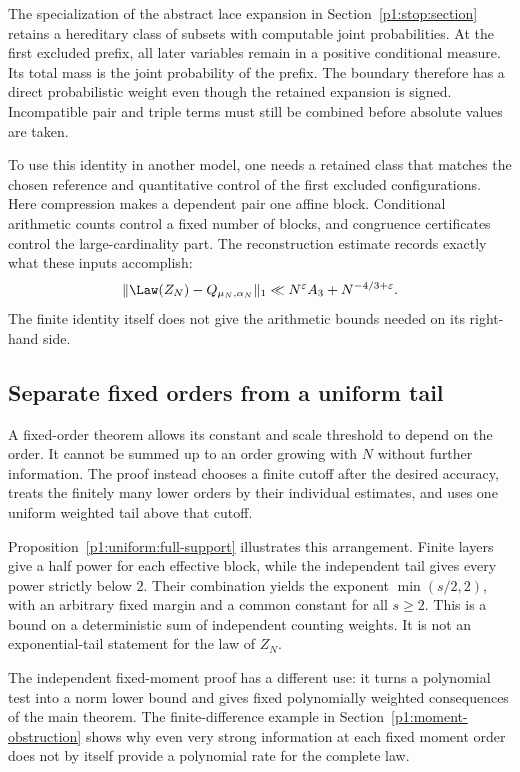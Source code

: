The specialization of the abstract lace expansion
\cite{zeilberger1997} in Section~\ref{p1:stop:section} retains a
hereditary class of subsets with computable joint probabilities.
At the first excluded prefix, all later variables remain in a
positive conditional measure. Its total mass is the joint
probability of the prefix. The boundary therefore has a direct
probabilistic weight even though the retained expansion is signed.
Incompatible pair and triple terms must still be combined before
absolute values are taken.

To use this identity in another model, one needs a retained class
that matches the chosen reference and quantitative control of the
first excluded configurations. Here compression makes a dependent
pair one affine block. Conditional arithmetic counts control a
fixed number of blocks, and congruence certificates control the
large-cardinality part. The reconstruction estimate records exactly
what these inputs accomplish:
\[
 \|\Law(Z_N)-Q_{\mu_N,\alpha_N}\|_1
       \ll N^\varepsilon A_3+N^{-4/3+\varepsilon}.
\]
The finite identity itself does not give the arithmetic bounds
needed on its right-hand side.

\subsection{Separate fixed orders from a uniform tail}

A fixed-order theorem allows its constant and scale threshold to
depend on the order. It cannot be summed up to an order growing
with \(N\) without further information. The proof instead chooses
a finite cutoff after the desired accuracy, treats the finitely
many lower orders by their individual estimates, and uses one
uniform weighted tail above that cutoff.

Proposition~\ref{p1:uniform:full-support} illustrates this
arrangement. Finite layers give a half power for each effective
block, while the independent tail gives every power strictly below
\(2\). Their combination yields the exponent
\(\min(s/2,2)\), with an arbitrary fixed margin and a common
constant for all \(s\ge2\). This is a bound on a deterministic
sum of independent counting weights. It is not an exponential-tail
statement for the law of \(Z_N\).

The independent fixed-moment proof has a different use: it turns a
polynomial test into a norm lower bound and gives fixed polynomially
weighted consequences of the main theorem. The finite-difference
example in Section~\ref{p1:moment-obstruction} shows why even very strong information at
each fixed moment order does not by itself provide a polynomial
rate for the complete law.

